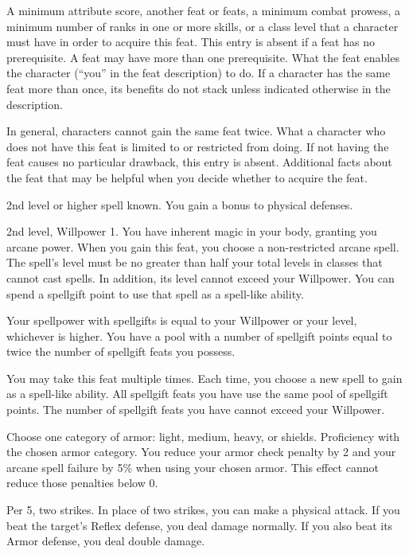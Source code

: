 \featpre A minimum attribute score, another feat or feats, a minimum combat prowess, a minimum number of ranks in one or more skills, or a class level that a character must have in order to acquire this feat.
This entry is absent if a feat has no prerequisite.
A feat may have more than one prerequisite.
\featben What the feat enables the character (``you'' in the feat description) to do.
If a character has the same feat more than once, its benefits do not stack unless indicated otherwise in the description.
\par In general, characters cannot gain the same feat twice.
What a character who does not have this feat is limited to or restricted from doing.
If not having the feat causes no particular drawback, this entry is absent.
Additional facts about the feat that may be helpful when you decide whether to acquire the feat.

\featpre 2nd level or higher  spell known.
\featben You gain a  bonus to physical defenses.

\featpres 2nd level, Willpower 1.
\featben You have inherent magic in your body, granting you arcane power.
When you gain this feat, you choose a non-restricted arcane spell.
The spell's level must be no greater than half your total levels in classes that cannot cast spells.
In addition, its level cannot exceed your Willpower.
You can spend a spellgift point to use that spell as a spell-like ability.

Your spellpower with spellgifts is equal to your Willpower or your level, whichever is higher.
You have a pool with a number of spellgift points equal to twice the number of spellgift feats you possess.

You may take this feat multiple times.
Each time, you choose a new spell to gain as a spell-like ability.
All spellgift feats you have use the same pool of spellgift points.
The number of spellgift feats you have cannot exceed your Willpower.

Choose one category of armor: light, medium, heavy, or shields.
\featpre Proficiency with the chosen armor category.
\featben You reduce your armor check penalty by 2 and your arcane spell failure by 5\% when using your chosen armor.
This effect cannot reduce those penalties below 0.

\featpre Per 5, two strikes.
\featben In place of two strikes, you can make a physical attack.
If you beat the target's Reflex defense, you deal damage normally.
If you also beat its Armor defense, you deal double damage.

